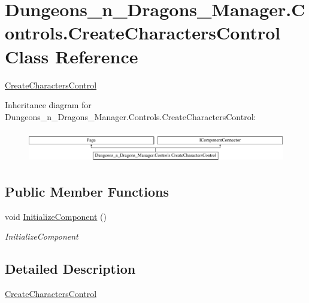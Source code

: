 \hypertarget{class_dungeons__n___dragons___manager_1_1_controls_1_1_create_characters_control}{}\section{Dungeons\+\_\+n\+\_\+\+Dragons\+\_\+\+Manager.\+Controls.\+Create\+Characters\+Control Class Reference}
\label{class_dungeons__n___dragons___manager_1_1_controls_1_1_create_characters_control}


\mbox{\hyperlink{class_dungeons__n___dragons___manager_1_1_controls_1_1_create_characters_control}{Create\+Characters\+Control}}  


Inheritance diagram for Dungeons\+\_\+n\+\_\+\+Dragons\+\_\+\+Manager.\+Controls.\+Create\+Characters\+Control\+:\begin{figure}[H]
\begin{center}
\leavevmode
\includegraphics[height=1.396509cm]{class_dungeons__n___dragons___manager_1_1_controls_1_1_create_characters_control}
\end{center}
\end{figure}
\subsection*{Public Member Functions}
\begin{DoxyCompactItemize}
\item 
void \mbox{\hyperlink{class_dungeons__n___dragons___manager_1_1_controls_1_1_create_characters_control_a491559e1c6f80ba14aee5dd2ea09cc87}{Initialize\+Component}} ()
\begin{DoxyCompactList}\small\item\em Initialize\+Component \end{DoxyCompactList}\end{DoxyCompactItemize}


\subsection{Detailed Description}
\mbox{\hyperlink{class_dungeons__n___dragons___manager_1_1_controls_1_1_create_characters_control}{Create\+Characters\+Control}} 



